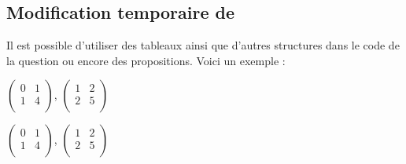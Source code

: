 \subsection{Modification temporaire de }
 Il est possible d'utiliser des tableaux ainsi que d'autres structures dans le code de la question ou encore des propositions. Voici un exemple :
\newlength{\oldtextwidth}

\begin{tkzltxexample}[small]
	\newlength{\oldtextwidth}
\end{tkzltxexample}

\medskip
	\setlength{\oldtextwidth}{\textwidth}
	\setlength{\textwidth}{14cm}
\begin{alterqcm}[lq=88mm,symb=$\Box$]
{%
{\(\begin{pmatrix}
        0 & 1 \\
        1 & 4 \\
\end{pmatrix}\)},%
{\(\begin{pmatrix}
        1 & 2 \\
        2 & 5 \\
 \end{pmatrix}\)}
}
\end{alterqcm}
\setlength{\textwidth}{\oldtextwidth}  

\medskip
\begin{tkzltxexample}[small]
  \setlength{\oldtextwidth}{\textwidth}
  \setlength{\textwidth}{14cm}
 \begin{alterqcm}[lq=88mm,symb=$\Box$]
 {%
 {\(\begin{pmatrix}
         0 & 1 \\
         1 & 4 \\
 \end{pmatrix}\)},%
 {\(\begin{pmatrix}
         1 & 2 \\
         2 & 5 \\
  \end{pmatrix}\)}
 }
 \end{alterqcm}
 \setlength{\textwidth}{\oldtextwidth}
\end{tkzltxexample}



\endinput